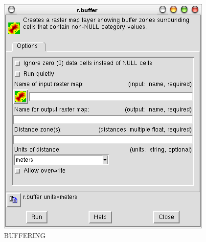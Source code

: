\begin{figure}[htbp]
   \centering
   \includegraphics[scale=0.35]{grass015.png}
   \caption{BUFFERING}
   \label{fig:grass015}
\end{figure}

